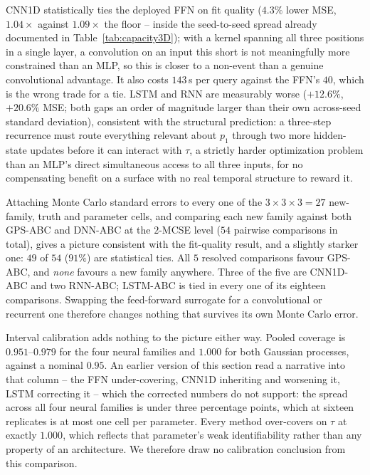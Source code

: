 \documentclass[sn-basic,iicol,pdflatex]{sn-jnl}
\begin{document}
CNN1D statistically ties the deployed FFN on fit quality ($4.3\%$ lower MSE,
$1.04\times$ against $1.09\times$ the floor -- inside the seed-to-seed spread
already documented in Table~\ref{tab:capacity3D}); with a kernel spanning all
three positions in a single layer, a convolution on an input this short is
not meaningfully more constrained than an MLP, so this is closer to a
non-event than a genuine convolutional advantage. It also costs
$143$\,\textmu s per query against the FFN's $40$, which is the wrong trade
for a tie. LSTM and RNN are measurably worse ($+12.6\%$, $+20.6\%$ MSE; both
gaps an order of magnitude larger than their own across-seed standard
deviation), consistent with the structural prediction: a three-step
recurrence must route everything relevant about $p_1$ through two more
hidden-state updates before it can interact with $\tau$, a strictly harder
optimization problem than an MLP's direct simultaneous access to all three
inputs, for no compensating benefit on a surface with no real temporal
structure to reward it.

Attaching Monte Carlo standard errors to every one of the
$3\times3\times3=27$ new-family, truth and parameter cells, and comparing each
new family against both GPS-ABC and DNN-ABC at the $2$-MCSE level ($54$
pairwise comparisons in total),
gives a picture consistent with the fit-quality result, and a slightly starker
one: $49$ of $54$ ($91\%$) are statistical ties. All $5$ resolved comparisons
favour GPS-ABC, and \emph{none} favours a new family anywhere. Three of the five
are CNN1D-ABC and two RNN-ABC; LSTM-ABC is tied in every one of its eighteen
comparisons. Swapping the feed-forward surrogate for a convolutional or
recurrent one therefore changes nothing that survives its own Monte Carlo error.

Interval calibration adds nothing to the picture either way. Pooled coverage is
$0.951$--$0.979$ for the four neural families and $1.000$ for both Gaussian
processes, against a nominal $0.95$. An earlier version of this section read a
narrative into that column -- the FFN under-covering, CNN1D inheriting and
worsening it, LSTM correcting it -- which the corrected numbers do not support:
the spread across all four neural families is under three percentage points,
which at sixteen replicates is at most one cell per parameter. Every method
over-covers on $\tau$ at exactly $1.000$, which reflects that parameter's weak
identifiability rather than any property of an architecture. We therefore draw
no calibration conclusion from this comparison.
\end{document}
